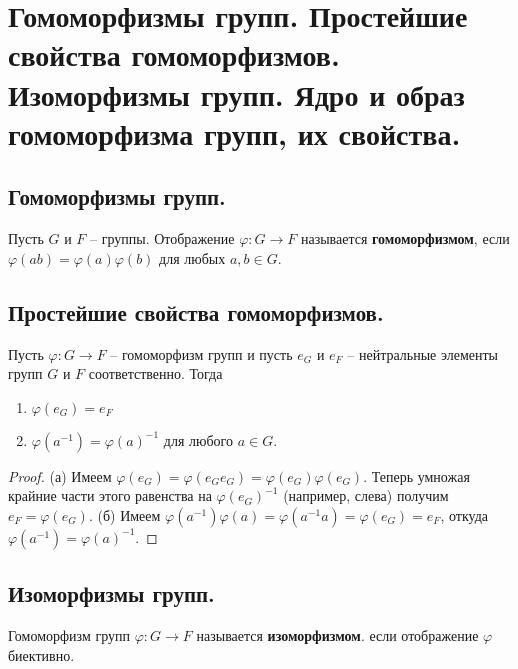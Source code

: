 \section{Гомоморфизмы групп. Простейшие свойства гомоморфизмов. Изоморфизмы групп. Ядро и образ гомоморфизма групп, их свойства.}

\subsection{Гомоморфизмы групп.}
\begin{definition}
    Пусть $G$ и $F$ -- группы. Отображение $\varphi : G \to F$ называется \textbf{гомоморфизмом}, если $\varphi(ab) = \varphi(a)\varphi(b)$ для любых $a, b \in G$.
\end{definition}

\subsection{Простейшие свойства гомоморфизмов.}
\begin{lemma}
    Пусть $\varphi : G \to F$ -- гомоморфизм групп и пусть $e_G$ и $e_F$ -- нейтральные элементы групп $G$ и $F$ соответственно. Тогда
    \begin{enumerate}
        \item[(а)] $\varphi(e_G) = e_F$
        \item[(б)] $\varphi(a^{-1}) = \varphi(a)^{-1}$ для любого $a \in G$.
    \end{enumerate}
    \begin{proof}
        (а) Имеем $\varphi(e_G) = \varphi(e_Ge_G) = \varphi(e_G)\varphi(e_G)$. Теперь умножая крайние части этого равенства на $\varphi(e_G)^{-1}$ (например, слева) получим $e_F = \varphi(e_G)$.
        \newline
        (б) Имеем $\varphi(a^{-1})\varphi(a) = \varphi(a^{-1}a) = \varphi(e_G) = e_F$, откуда $\varphi(a^{-1}) = \varphi(a)^{-1}$.
    \end{proof}
\end{lemma}

\subsection{Изоморфизмы групп.}
\begin{definition}
    Гомоморфизм групп $\varphi : G \to F$ называется \textbf{изоморфизмом}. если отображение $\varphi$ биективно.
\end{definition}

